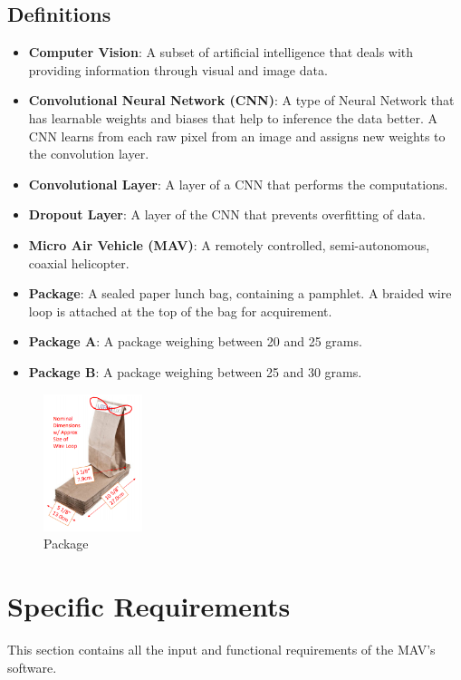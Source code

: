 \documentclass[onecolumn, draftclsnofoot, 10pt, compsoc]{IEEEtran}
\begin{document}
\subsection{Definitions}
\begin{itemize}
    \item \textbf{Computer Vision}: A subset of artificial intelligence that deals with providing information through visual and image data.
    \item \textbf{Convolutional Neural Network (CNN)}: A type of Neural Network that has learnable weights and biases that help to inference the data better. A CNN learns from each raw pixel from an image and assigns new weights to the convolution layer.
    \item \textbf{Convolutional Layer}: A layer of a CNN that performs the computations.
    \item \textbf{Dropout Layer}: A layer of the CNN that prevents overfitting of data.
    \item \textbf{Micro Air Vehicle (MAV)}: A remotely controlled, semi-autonomous, coaxial helicopter.
    \item \textbf{Package}: A sealed paper lunch bag, containing a pamphlet. A braided wire loop is attached at the top of the bag for acquirement.
    \item \textbf{Package A}: A package weighing between 20 and 25 grams.
    \item \textbf{Package B}: A package weighing between 25 and 30 grams.
\end{itemize}
\begin{figure}[h!]
\centering
\includegraphics[height=4cm]{bag}
\caption{Package}
\end{figure}
\section{Specific Requirements}
This section contains all the input and functional requirements of the MAV's software.
\end{document}
